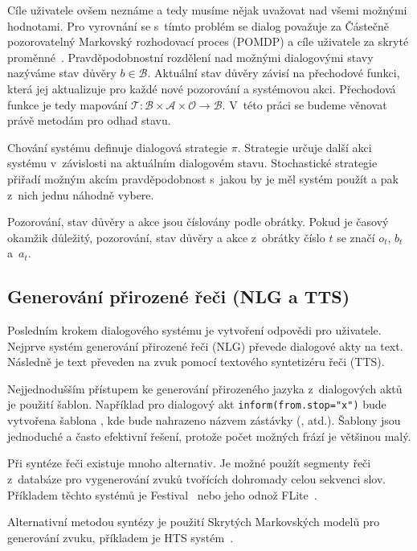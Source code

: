 Cíle uživatele ovšem neznáme a tedy musíme nějak uvažovat nad všemi možnými hodnotami.
Pro vyrovnání se s~tímto problém se dialog považuje za Částečně pozorovatelný Markovský rozhodovací proces (POMDP) a cíle uživatele za skryté proměnné~\cite{williams2007partially}.
Pravděpodobnostní rozdělení nad možnými dialogovými stavy nazýváme stav důvěry $b \in \mathcal{B}$.
Aktuální stav důvěry závisí na přechodové funkci, která jej aktualizuje pro každé nové pozorování a systémovou akci.
Přechodová funkce je tedy mapování $\mathcal{T} : \mathcal{B} \times \mathcal{A} \times \mathcal{O} \longrightarrow \mathcal{B}$.
V~této práci se budeme věnovat právě metodám pro odhad stavu.

Chování systému definuje dialogová strategie $\pi$.
Strategie určuje další akci systému v~závislosti na aktuálním dialogovém stavu.
Stochastické strategie přiřadí možným akcím pravděpodobnost s~jakou by je měl systém použít a pak z~nich jednu náhodně vybere.

Pozorování, stav důvěry a akce jsou číslovány podle obrátky.
Pokud je časový okamžik důležitý, pozorování, stav důvěry a akce z~obrátky číslo $t$ se značí $o_t$, $b_t$ a~$a_t$.

\subsection{Generování přirozené řeči (NLG a TTS)}

Posledním krokem dialogového systému je vytvoření odpovědi pro uživatele.
Nejprve systém generování přirozené řeči (NLG) převede dialogové akty na text.
Následně je text převeden na zvuk pomocí textového syntetizéru řeči (TTS).

Nejjednodušším přístupem ke generování přirozeného jazyka z~dialogových aktů je použití šablon.
Například pro dialogový akt {\tt inform(from.stop="x")} bude vytvořena šablona , kde  bude nahrazeno názvem zástávky (,  atd.).
Šablony jsou jednoduché a často efektivní řešení, protože počet možných frází je většinou malý.

Při syntéze řeči existuje mnoho alternativ.
Je možné použít segmenty řeči z~databáze pro vygenerování zvuků tvořících dohromady celou sekvenci slov.
Příkladem těchto systémů je Festival~\cite{black2001festival} nebo jeho odnož  FLite~\cite{black2001flite}.

Alternativní metodou syntézy je použití Skrytých Markovských modelů pro generování zvuku, příkladem je HTS systém~\cite{zen2007hmm}.

